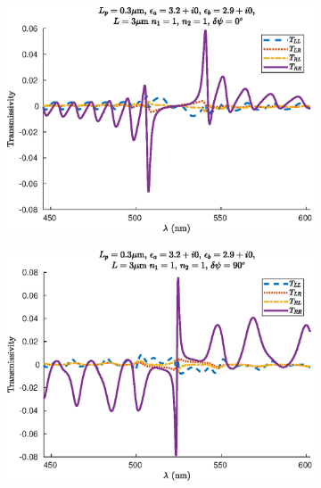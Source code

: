 \begin{figure}
	\centering
	\begin{subfigure}{0.49\linewidth}
		\includegraphics[width=\linewidth]{plots/defect/no_defect/comparison_transmission}
		\caption{}
	\end{subfigure}
	\begin{subfigure}{0.49\linewidth}
		\includegraphics[width=\linewidth]{plots/defect/reflectivity/comparison_transmission}
		\caption{}
	\end{subfigure}
	\begin{subfigure}{0.49\linewidth}

\end{subfigure}
\end{figure}
